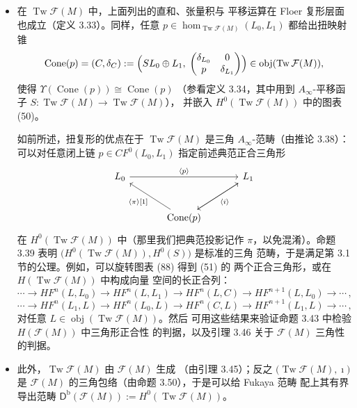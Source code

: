 \begin{itemize}
  借助全嵌入 $\mathcal F(M)\hookrightarrow\operatorname{Tw}\mathcal F(M)$，
  通常的拉格朗日子流形可视为平凡的扭复形。特别地，
  $\operatorname{Tw}\mathcal F(M)$ 是 c-幺的（由引理 3.31），而推论 3.32
  通过拟等价把它与其它扭复形的 $A_\infty$-范畴联系起来。
  \item 在 $\operatorname{Tw}\mathcal F(M)$ 中，上面列出的直和、张量积与
  平移运算在 Floer 复形层面也成立（定义 3.33）。同样，任意
  $p\in\hom_{\operatorname{Tw}\mathcal F(M)}(L_0,L_1)$ 都给出扭映射锥
  \[
  \operatorname{Cone}(p)=(C,\delta_C)
  :=\Bigl(SL_0\oplus L_1,\;
  \begin{pmatrix}\delta_{L_0}&0\\ p&\delta_{L_1}\end{pmatrix}\Bigr)
  \in\operatorname{obj}(\operatorname{Tw}\mathcal F(M)),
  \]
  使得 $\Upsilon(\operatorname{Cone}(p))\cong\operatorname{Cone}(p)$
  （参看定义 3.34，其中用到 $A_\infty$-平移函子
  $S:\operatorname{Tw}\mathcal F(M)\to\operatorname{Tw}\mathcal F(M)$），
  并嵌入 $H^0(\operatorname{Tw}\mathcal F(M))$ 中的图表 (50)。

  如前所述，扭复形的优点在于 $\operatorname{Tw}\mathcal F(M)$ 是三角
  $A_\infty$-范畴（由推论 3.38）：可以对任意闭上链
  $p\in CF^0(L_0,L_1)$ 指定前述典范正合三角形
  \begin{equation}
  \begin{tikzcd}[row sep=2.6em, column sep=3.4em]
  L_0 \arrow[rr, "\langle p\rangle"] & & L_1 \arrow[dl] \\
  & \operatorname{Cone}(p) \arrow[ul, "\langle \pi\rangle{[}1{]}"] \arrow[ur, "\langle i\rangle" swap] &
  \end{tikzcd}
  \label{eq:6.88}
  \end{equation}
  在 $H^0(\operatorname{Tw}\mathcal F(M))$ 中（那里我们把典范投影记作
  $\pi$，以免混淆）。命题 3.39 表明
  $\bigl(H^0(\operatorname{Tw}\mathcal F(M)),H^0(S)\bigr)$ 是标准的三角
  范畴，于是满足第 3.1 节的公理。例如，可以旋转图表 (88) 得到 (51) 的
  两个正合三角形，或在 $H(\operatorname{Tw}\mathcal F(M))$ 中构成向量
  空间的长正合列：
  \[
  \cdots\to HF^n(L,L_0)\to HF^n(L,L_1)\to HF^n(L,C)
  \to HF^{n+1}(L,L_0)\to\cdots\,,
  \]
  \[
  \cdots\to HF^n(L_1,L)\to HF^n(L_0,L)\to HF^n(C,L)
  \to HF^{n+1}(L_1,L)\to\cdots\,,
  \]
  对任意 $L\in\operatorname{obj}(\operatorname{Tw}\mathcal F(M))$。然后
  可用这些结果来验证命题 3.43 中检验 $H(\mathcal F(M))$ 中三角形正合性
  的判据，以及引理 3.46 关于 $\mathcal F(M)$ 三角性的判据。
  \item 此外，$\operatorname{Tw}\mathcal F(M)$ 由 $\mathcal F(M)$ 生成
  （由引理 3.45）；反之 $\bigl(\operatorname{Tw}\mathcal F(M),\imath\bigr)$
  是 $\mathcal F(M)$ 的三角包络（由命题 3.50），于是可以给 Fukaya 范畴
  配上其有界导出范畴
  $\mathsf D^{\mathrm b}(\mathcal F(M)):=H^0(\operatorname{Tw}\mathcal F(M))$。


\end{itemize}
